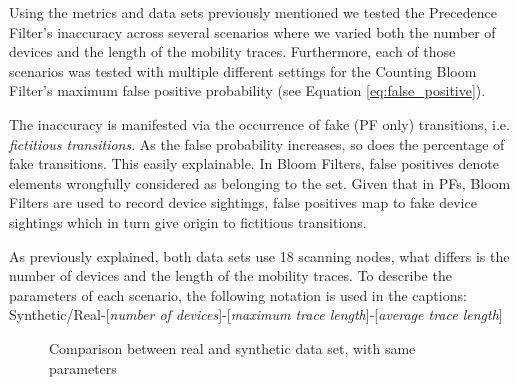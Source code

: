 Using the metrics and data sets previously mentioned we tested the
Precedence Filter's inaccuracy across several scenarios where we
varied both the number of devices and the length of the mobility
traces. Furthermore, each of those scenarios was tested with multiple
different settings for the Counting Bloom Filter's maximum false
positive probability (see Equation \ref{eq:false_positive}).

The inaccuracy is manifested via the occurrence of fake (PF only)
transitions, i.e. \emph{fictitious transitions}. As the false
probability increases, so does the percentage of fake
transitions.  This easily explainable. In Bloom Filters, false
positives denote elements wrongfully considered as belonging to the
set.  Given that in PFs, Bloom Filters are used to record device
sightings, false positives map to fake device sightings which in turn
give origin to fictitious transitions.

As previously explained, both data sets use 18 scanning nodes, what
differs is the number of devices and the length of the mobility
traces. To describe the parameters of each scenario, the following
notation is used in the captions: Synthetic/Real-[\emph{number of
  devices}]-[\emph{maximum trace length}]-[\emph{average trace
  length}]

\begin{figure}[htb]
\centering
 \hspace*{-0.7em}
\caption{Comparison between real and synthetic data set, with same parameters}
\label{fig:perf_results_real_sim}
\end{figure}


